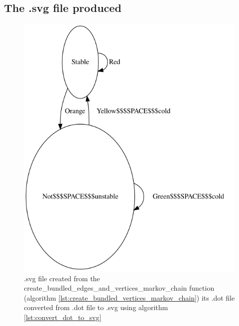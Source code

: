 

\subsection{The .svg file produced}

\begin{figure}[!htbp]
  \includegraphics[]{create_bundled_edges_and_vertices_markov_chain.png}
  \caption{
    .svg file created from the create\_bundled\_edges\_and\_vertices\_markov\_chain function 
    (algorithm  \ref{lst:create_bundled_vertices_markov_chain}) 
    its .dot file converted from .dot file to .svg using algorithm 
    \ref{lst:convert_dot_to_svg}
  }
  \label{fig:create_bundled_edges_and_vertices_markov_chain.svg}
\end{figure}


